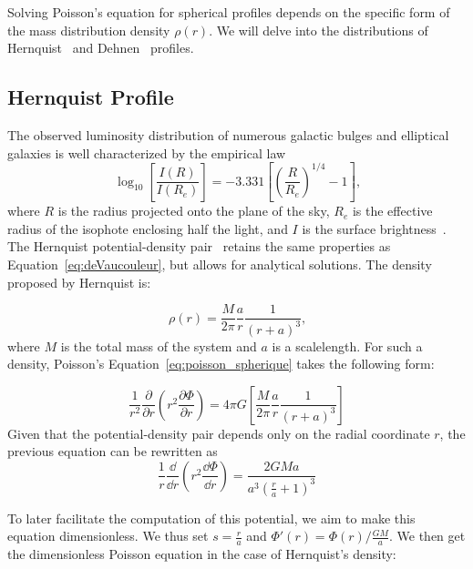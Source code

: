 Solving Poisson's equation for spherical profiles depends on the specific form of the mass distribution density $\rho(r)$. We will delve into the distributions of Hernquist~\cite{hernquist_analytical_1990} and Dehnen~\cite{dehnen_family_1993} profiles.

\subsection{Hernquist Profile}
The observed luminosity distribution of numerous galactic bulges and elliptical galaxies is well characterized by the empirical law
\begin{equation}
\label{eq:deVaucouleur}
\log_{10} \left[ \frac{I(R)}{I(R_e)}\right] = -3.331 \left[ \left(\frac{R}{R_e}\right)^{1/4} - 1\right]\text{,}
\end{equation}
where $R$ is the radius projected onto the plane of the sky, $R_e$ is the effective radius of the isophote enclosing half the light, and $I$ is the surface brightness~\cite{deVaucouleurs1948}. The Hernquist potential-density pair~\cite{hernquist_analytical_1990} retains the same properties as Equation~\eqref{eq:deVaucouleur}, but allows for analytical solutions. The density proposed by Hernquist is:

\begin{equation}
\label{eq:hernquist_density}
\rho(r) = \dfrac{M}{2\pi}\dfrac{a}{r}\dfrac{1}{(r+a)^3}\text{,}
\end{equation}
where $M$ is the total mass of the system and $a$ is a scalelength. For such a density, Poisson's Equation~\eqref{eq:poisson_spherique} takes the following form:

\begin{equation*}
\dfrac{1}{r^2} \dfrac{\partial}{\partial r}\left(r^2 \dfrac{\partial \Phi}{\partial r}\right) = 4\pi G \left[\dfrac{M}{2\pi}\dfrac{a}{r}\dfrac{1}{(r+a)^3}\right]
\end{equation*}
Given that the potential-density pair depends only on the radial coordinate $r$, the previous equation can be rewritten as
\begin{equation*}
\dfrac{1}{r} \dfrac{\dd}{\dd r}\left(r^2 \dfrac{\dd \Phi}{\dd r}\right) = \dfrac{2GMa}{a^3(\frac{r}{a}+1)^3}
\end{equation*}

To later facilitate the computation of this potential, we aim to make this equation dimensionless. We thus set $s = \frac{r}{a}$ and $\Phi'(r) = \Phi(r)/\frac{GM}{a}$. We then get the dimensionless Poisson equation in the case of Hernquist's density:

